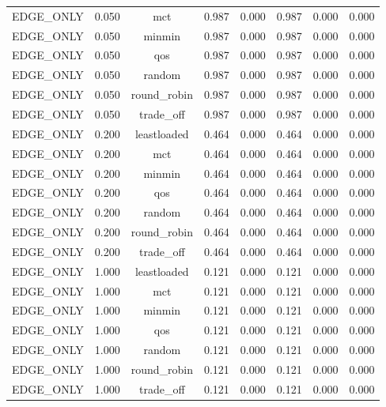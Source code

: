 \begin{table}
\begin{tabular}{lccccccc}
EDGE\_ONLY & 0.050 & mct & 0.987 & 0.000 & 0.987 & 0.000 & 0.000 \\
EDGE\_ONLY & 0.050 & minmin & 0.987 & 0.000 & 0.987 & 0.000 & 0.000 \\
EDGE\_ONLY & 0.050 & qos & 0.987 & 0.000 & 0.987 & 0.000 & 0.000 \\
EDGE\_ONLY & 0.050 & random & 0.987 & 0.000 & 0.987 & 0.000 & 0.000 \\
EDGE\_ONLY & 0.050 & round\_robin & 0.987 & 0.000 & 0.987 & 0.000 & 0.000 \\
EDGE\_ONLY & 0.050 & trade\_off & 0.987 & 0.000 & 0.987 & 0.000 & 0.000 \\
EDGE\_ONLY & 0.200 & leastloaded & 0.464 & 0.000 & 0.464 & 0.000 & 0.000 \\
EDGE\_ONLY & 0.200 & mct & 0.464 & 0.000 & 0.464 & 0.000 & 0.000 \\
EDGE\_ONLY & 0.200 & minmin & 0.464 & 0.000 & 0.464 & 0.000 & 0.000 \\
EDGE\_ONLY & 0.200 & qos & 0.464 & 0.000 & 0.464 & 0.000 & 0.000 \\
EDGE\_ONLY & 0.200 & random & 0.464 & 0.000 & 0.464 & 0.000 & 0.000 \\
EDGE\_ONLY & 0.200 & round\_robin & 0.464 & 0.000 & 0.464 & 0.000 & 0.000 \\
EDGE\_ONLY & 0.200 & trade\_off & 0.464 & 0.000 & 0.464 & 0.000 & 0.000 \\
EDGE\_ONLY & 1.000 & leastloaded & 0.121 & 0.000 & 0.121 & 0.000 & 0.000 \\
EDGE\_ONLY & 1.000 & mct & 0.121 & 0.000 & 0.121 & 0.000 & 0.000 \\
EDGE\_ONLY & 1.000 & minmin & 0.121 & 0.000 & 0.121 & 0.000 & 0.000 \\
EDGE\_ONLY & 1.000 & qos & 0.121 & 0.000 & 0.121 & 0.000 & 0.000 \\
EDGE\_ONLY & 1.000 & random & 0.121 & 0.000 & 0.121 & 0.000 & 0.000 \\
EDGE\_ONLY & 1.000 & round\_robin & 0.121 & 0.000 & 0.121 & 0.000 & 0.000 \\
EDGE\_ONLY & 1.000 & trade\_off & 0.121 & 0.000 & 0.121 & 0.000 & 0.000 \\
\bottomrule
\end{tabular}
\par\vspace{2pt}{\footnotesize\raggedright Mist / Edge / Cloud columns sum to the success ratio. The spread across algorithms in these columns is what the architecture factor is made of.\par}
\end{table}

